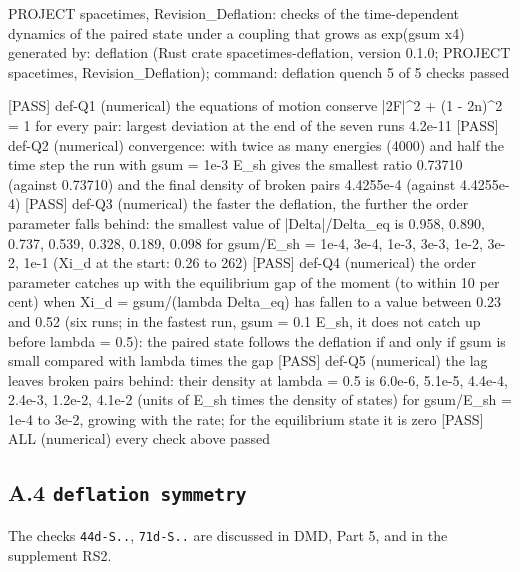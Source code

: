 \documentclass[
  10pt,
]{article}
\newenvironment{Shaded}{}{}
\newcommand{\NormalTok}[1]{#1}
\begin{document}
\begin{Shaded}
\begin{Highlighting}[]
\NormalTok{PROJECT spacetimes, Revision\_Deflation: checks of the time{-}dependent dynamics of the paired state under a coupling that grows as exp(gsum x4)}
\NormalTok{generated by: deflation (Rust crate spacetimes{-}deflation, version 0.1.0; PROJECT spacetimes, Revision\_Deflation); command: deflation quench}
\NormalTok{5 of 5 checks passed}

\NormalTok{[PASS] def{-}Q1  (numerical) the equations of motion conserve |2F|\^{}2 + (1 {-} 2n)\^{}2 = 1 for every pair: largest deviation at the end of the seven runs 4.2e{-}11}
\NormalTok{[PASS] def{-}Q2  (numerical) convergence: with twice as many energies (4000) and half the time step the run with gsum = 1e{-}3 E\_sh gives the smallest ratio 0.73710 (against 0.73710) and the final density of broken pairs 4.4255e{-}4 (against 4.4255e{-}4)}
\NormalTok{[PASS] def{-}Q3  (numerical) the faster the deflation, the further the order parameter falls behind: the smallest value of |Delta|/Delta\_eq is 0.958, 0.890, 0.737, 0.539, 0.328, 0.189, 0.098 for gsum/E\_sh = 1e{-}4, 3e{-}4, 1e{-}3, 3e{-}3, 1e{-}2, 3e{-}2, 1e{-}1 (Xi\_d at the start: 0.26 to 262)}
\NormalTok{[PASS] def{-}Q4  (numerical) the order parameter catches up with the equilibrium gap of the moment (to within 10 per cent) when Xi\_d = gsum/(lambda Delta\_eq) has fallen to a value between 0.23 and 0.52 (six runs; in the fastest run, gsum = 0.1 E\_sh, it does not catch up before lambda = 0.5): the paired state follows the deflation if and only if gsum is small compared with lambda times the gap}
\NormalTok{[PASS] def{-}Q5  (numerical) the lag leaves broken pairs behind: their density at lambda = 0.5 is 6.0e{-}6, 5.1e{-}5, 4.4e{-}4, 2.4e{-}3, 1.2e{-}2, 4.1e{-}2 (units of E\_sh times the density of states) for gsum/E\_sh = 1e{-}4 to 3e{-}2, growing with the rate; for the equilibrium state it is zero}
\NormalTok{[PASS] ALL  (numerical) every check above passed}
\end{Highlighting}
\end{Shaded}

\hypertarget{a.4-deflation-symmetry}{%
\subsection{\texorpdfstring{A.4
\texttt{deflation\ symmetry}}{A.4 deflation symmetry}}\label{a.4-deflation-symmetry}}

The checks \texttt{44d-S..}, \texttt{71d-S..} are discussed in DMD, Part
5, and in the supplement RS2.
\end{document}
